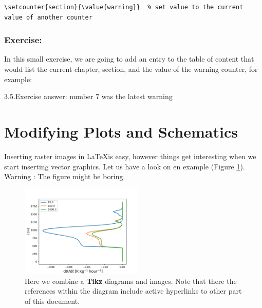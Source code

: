 \documentclass[a4paper,10pt]{report} %
\begin{document}
\begin{lstlisting}[language={[latex]tex}, frame=single,basicstyle=\footnotesize\color{darkgray}, 
  keywordstyle=\bf\color{magenta},
  commentstyle=\color{ForestGreen},  
  breaklines=true
  ]
\setcounter{section}{\value{warning}}  % set value to the current  value of another counter 
\end{lstlisting}

\subsubsection{Exercise:}
In this small exercise, we are going to add an entry to the table of content that would list the current chapter, section, and the value of the warning counter, for example:\\

\begin{center}
 3.5.Exercise answer: number 7 was the latest warning 
\end{center}




\newpage 
 \section{Modifying Plots and Schematics}\label{sec:figures}
 
 Inserting raster images in \LaTeX is easy, however things get interesting when we start inserting vector graphics. Let us have a look on en example (Figure \ref{fig:figures}). Warning :  The figure might be boring.\\
 \begin{figure}[!ht] 
     \includegraphics[width=0.52\textwidth]{./figures/prof_tend.pdf}
        \caption[Diagrams and plots]{Here we combine a \textbf{Tikz} diagrams and images. Note that there the references within the diagram include active hyperlinks to other part of this document.}    
      \label{fig:figures}    
 \end{figure}
 
\end{document}
